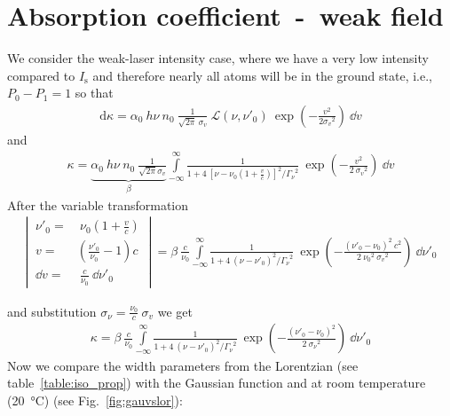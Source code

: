 \section{\label{sec:weakfield}Absorption coefficient~-~weak field}   %

We consider the weak-laser intensity case, where we have a very low intensity compared to 
\(I_\mathrm{s}\) and therefore nearly all atoms will be in the ground state, i.e., 
\(P_0-P_1 = 1 \) so that
\begin{align}
    \mathrm{d}\kappa = \alpha_0 ~ h\nu ~ n_0~\frac{1}{\sqrt{2\pi}~\sigma_v} ~
    \mathcal{L}(\nu,\nu'_0)~\exp{ \left( -\frac{v^2}{2 {\sigma_v}^2} \right ) }~
    \dd v
\end{align}
and
\begin{align}
    \kappa = \underbrace{ \alpha_0 ~ h\nu ~ n_0 ~ \frac{1}{\sqrt{2\pi}\sigma_v} }_{\beta} 
    \int\limits_{-\infty}^{\infty} 
    \frac{1}{ 1+4~{\left [\nu-\nu_0\left ( 1 + \frac{v}{c} \right) \right] }^2 / {\Gamma_\nu}^2 }~ 
    \exp{ \left (-\frac{v^2}{ 2~ {\sigma_v}^2 }\right ) }~\dd v
\end{align}
After the variable transformation
\begin{align*}
\left |~
    \begin{aligned}
        \nu'_0 =&~\nu_0\left ( 1+ \frac{v}{c} \right) \\
        v =&\left ( \frac{\nu'_0}{\nu_0} - 1 \right) c \\
        \dd v =&~\frac{c}{\nu_0}~\dd \nu'_0
    \end{aligned}
    ~\right |~ = \beta~\frac{c}{\nu_0} \int\limits_{-\infty}^{\infty} 
    \frac{1}{ 1+4~{(\nu-\nu'_0)}^2 / {\Gamma_\nu}^2 }~ 
    \exp{ \left ( -\frac{{(\nu'_0 - \nu_0)}^2~c^2 }{2~{\nu_0}^2~{\sigma_v}^2 } \right )}~
    \dd \nu'_0
\end{align*} 

and substitution \(\sigma_\nu = \frac{\nu_0}{c}~\sigma_v \) we get
\begin{align}
    \kappa = \beta~\frac{c}{\nu_0} \int\limits_{-\infty}^{\infty} 
    \frac{1}{ 1+4~{(\nu-\nu'_0)}^2 / {\Gamma_\nu}^2 }~ 
\exp{ \left ( -\frac{{(\nu'_0 - \nu_0)}^2 }{2~{\sigma_\nu}^2 } \right )}~\dd \nu'_0 
\label{eq:intlorgau}
\end{align}
Now we compare the width parameters from the Lorentzian (see table~\ref{table:iso_prop}) 
with the Gaussian function and at room temperature (\SI{20}{\degreeCelsius}) (see
Fig.~\ref{fig:gauvslor}):

